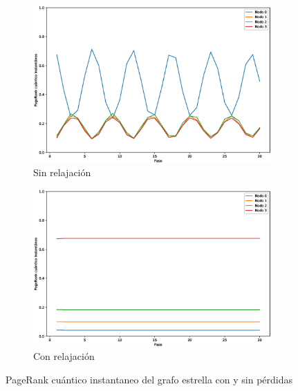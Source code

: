 \begin{figure}[H]
    \centering
    \begin{subfigure}[m]{0.45\textwidth}
        \centering
        \includegraphics[width=0.9\linewidth]{img/star-inst-lossless.eps}
        \caption{Sin relajación}
    \end{subfigure}
    \begin{subfigure}[m]{0.45\textwidth}
        \centering
        \includegraphics[width=0.9\linewidth]{img/star-inst-lossy.eps}
        \caption{Con relajación}
    \end{subfigure}
    \caption[PageRank cuántico instantaneo del grafo estrella con y sin pérdidas]{PageRank cuántico instantaneo del grafo estrella con y sin pérdidas}
    \label{fig:inststarlossy}
\end{figure}

